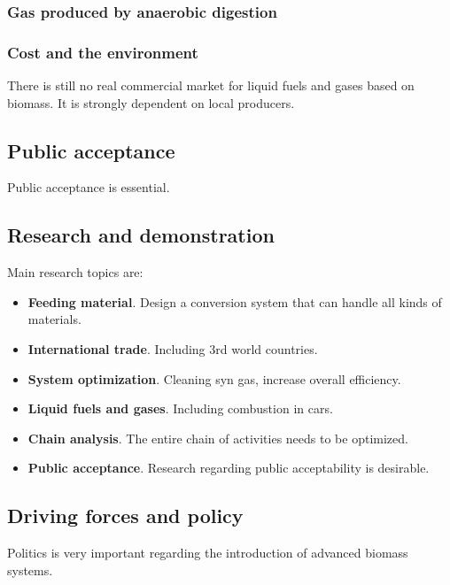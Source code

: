 \documentclass[a4paper,10pt]{article}
\begin{document}
\subsubsection{Gas produced by anaerobic digestion}
\subsubsection{Cost and the environment}
There is still no real commercial market for liquid fuels and gases based on biomass. It is strongly dependent on local producers.

\subsection{Public acceptance}
Public acceptance is essential.

\subsection{Research and demonstration}
Main research topics are:
\begin{itemize}
 \item \textbf{Feeding material}. Design a conversion system that can handle all kinds of materials.
 \item \textbf{International trade}. Including 3rd world countries.
 \item \textbf{System optimization}. Cleaning syn gas, increase overall efficiency.
 \item \textbf{Liquid fuels and gases}. Including combustion in cars.
 \item \textbf{Chain analysis}. The entire chain of activities needs to be optimized.
 \item \textbf{Public acceptance}. Research regarding public acceptability is desirable.
\end{itemize}



\subsection{Driving forces and policy}
Politics is very important regarding the introduction of advanced biomass systems.
\end{document}
